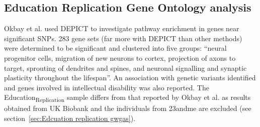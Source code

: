 




\subsection{Education Replication Gene Ontology analysis}
Okbay et al.\cite{okbay2016genome}  used DEPICT\cite{pers2015biological} to investigate pathway enrichment in genes near significant SNPs. 283 gene sets (far more with DEPICT than other methods) were determined to be significant and clustered into five groups: ``neural progenitor cells, migration of new neurons to cortex, projection of axons to target, sprouting of dendrites and spines, and neuronal signalling and synaptic plasticity throughout the lifespan''\cite{okbay2016genome}. An association with genetic variants identified and  genes involved in intellectual disability was also reported. The Education\textsubscript{Replication} sample differs from that reported by Okbay et al. \cite{okbay2016genome} as results obtained from UK Biobank and the individuals from 23andme are excluded (see section~\ref{sec:Edcuation replication gwgas}).



